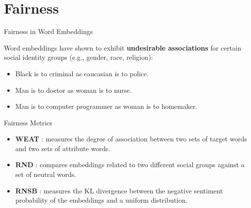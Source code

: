 \documentclass[handout]{beamer}
\begin{document}
\section{Fairness}


\begin{frame}{Fairness in Word Embeddings}
\begin{scriptsize}
 Word embeddings have shown to exhibit \textbf{undesirable associations} for certain social identity groups (e.g., gender, race, religion):
\begin{itemize}
\item Black is to criminal as caucasian is to police.
\item Man is to doctor as woman is to nurse.
\item Man is to computer programmer as woman is to homemaker.
\end{itemize}


\end{scriptsize}
\end{frame}

\begin{frame}{Fairness Metrics}
\begin{scriptsize}

\begin{itemize}
 \item \textbf{WEAT} \cite{caliskan2017semantics}:  measures the degree of association between two sets of target words and two sets of attribute words.


\item \textbf{RND} \cite{garg2018word}: compares embeddings related to two different social groups against a set of neutral words.

\item \textbf{RNSB} \cite{sweeney2019transparent}:  measures the KL divergence between the negative sentiment probability of the embeddings and a uniform distribution.
\end{itemize}






\end{scriptsize}
\end{frame}
\end{document}
